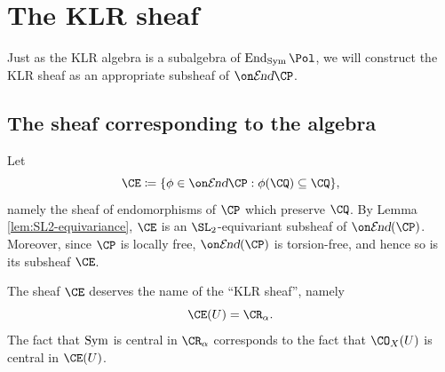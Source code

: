 \documentclass[11pt,reqno]{amsart}
\begin{document}
\section{The KLR sheaf}
Just as the KLR algebra is a subalgebra of $\End_{\Sym}\Pol$, we will construct the KLR sheaf as an appropriate subsheaf of $\shend\CP$. 

\subsection{The sheaf corresponding to the algebra}
Let
\[\CE\coloneqq\{\phi\in \shend\CP:\phi(\CQ)\subseteq \CQ\},\]
namely the sheaf of endomorphisms of $\CP$ which preserve $\CQ$. By Lemma \ref{lem:SL2-equivariance}, $\CE$ is an
$\SL_2$-equivariant subsheaf of $\shend(\CP)$. Moreover, since
$\CP$ is locally free, $\shend(\CP)$ is torsion-free, and hence so is
its subsheaf $\CE$.
\begin{theorem}\label{thm:E=R}
    The sheaf $\CE$ deserves the name of the ``KLR sheaf'', namely
    \[\CE(U)=\CR_\alpha.\]
    The fact that $\operatorname{Sym}$ is central in $\CR_\alpha$ corresponds to the fact that $\CO_X(U)$ is central in $\CE(U)$. 
\end{theorem}
\end{document}
